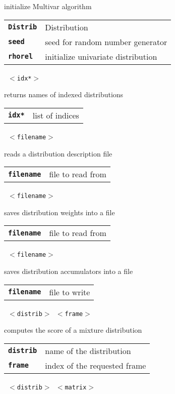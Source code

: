 \begin{description}
\begin{description}
        initialize Multivar algorithm

      \begin{tabular}{ll}
 \texttt{\textbf{Distrib}} &  Distribution \\
 \texttt{\textbf{seed}} &      seed for random number generator  \\
 \texttt{\textbf{rhorel}} &    initialize univariate distribution  \\
      \end{tabular}
       \texttt{ $<$idx*$>$} \

        returns names of indexed distributions

      \begin{tabular}{ll}
 \texttt{\textbf{idx*}} & list of indices \\
      \end{tabular}
       \texttt{ $<$filename$>$} \

        reads a distribution description file

      \begin{tabular}{ll}
 \texttt{\textbf{filename}} &  file to read from  \\
      \end{tabular}
       \texttt{ $<$filename$>$} \

        saves distribution weights into a file

      \begin{tabular}{ll}
 \texttt{\textbf{filename}} &  file to read from  \\
      \end{tabular}
       \texttt{ $<$filename$>$} \

        saves distribution accumulators into a file

      \begin{tabular}{ll}
 \texttt{\textbf{filename}} &  file to write  \\
      \end{tabular}
       \texttt{ $<$distrib$>$ $<$frame$>$} \

        computes the score of a mixture distribution

      \begin{tabular}{ll}
 \texttt{\textbf{distrib}} &  name of the distribution \\
 \texttt{\textbf{frame}} &    index of the requested frame  \\
      \end{tabular}
       \texttt{ $<$distrib$>$ $<$matrix$>$      } \


\end{description}
\end{description}
